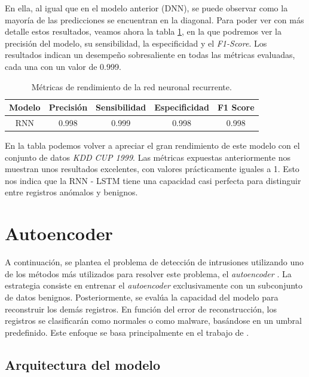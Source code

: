 En ella, al igual que en el modelo anterior (DNN), se puede observar como la mayoría de las predicciones se encuentran en la diagonal. Para poder ver con más detalle estos resultados, veamos ahora la tabla \ref{tab:kddRNN}, en la que podremos ver la precisión del modelo, su sensibilidad, la especificidad y el \textit{F1-Score}. Los resultados indican un desempeño sobresaliente en todas las métricas evaluadas, cada una con un valor de 0.999.

\begin{table}[H]
\centering
\begin{tabular}{|c|c|c|c|c|}
\hline
Modelo & Precisión & Sensibilidad & Especificidad & F1 Score \\ \hline
RNN & 0.998 & 0.999 & 0.998 & 0.998 \\ \hline
\end{tabular}
\caption{Métricas de rendimiento de la red neuronal recurrente.}
\label{tab:kddRNN}
\end{table}

En la tabla podemos volver a apreciar el gran rendimiento de este modelo con el conjunto de datos \textit{KDD CUP 1999}. Las métricas expuestas anteriormente nos muestran unos resultados excelentes, con valores prácticamente iguales a 1. Esto nos indica que la RNN - LSTM tiene una capacidad casi perfecta para distinguir entre registros anómalos y benignos. 












\section{Autoencoder}
A continuación, se plantea el problema de detección de intrusiones utilizando uno de los métodos más utilizados para resolver este problema, el \textit{autoencoder} \citep{podder2021artificial}. La estrategia consiste en entrenar el \textit{autoencoder} exclusivamente con un subconjunto de datos benignos. Posteriormente, se evalúa la capacidad del modelo para reconstruir los demás registros. En función del error de reconstrucción, los registros se clasificarán como normales o como malware, basándose en un umbral predefinido. Este enfoque se basa principalmente en el trabajo de \citep{xu2021improving}.


\subsection{Arquitectura del modelo}

